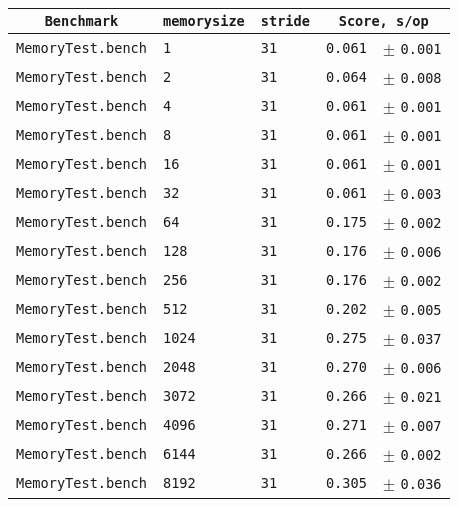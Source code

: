 \begin{tabular}{r|l|l|rl}
 \multicolumn{1}{c|}{\texttt{Benchmark}} & \texttt{memorysize} & \texttt{stride} & \multicolumn{2}{c}{\texttt{Score, s/op}} \\
\hline
\texttt{MemoryTest.bench} & \texttt{1} & \texttt{31} & \texttt{0.061} & \scriptsize $\pm$ \texttt{0.001}  \\
\texttt{MemoryTest.bench} & \texttt{2} & \texttt{31} & \texttt{0.064} & \scriptsize $\pm$ \texttt{0.008}  \\
\texttt{MemoryTest.bench} & \texttt{4} & \texttt{31} & \texttt{0.061} & \scriptsize $\pm$ \texttt{0.001}  \\
\texttt{MemoryTest.bench} & \texttt{8} & \texttt{31} & \texttt{0.061} & \scriptsize $\pm$ \texttt{0.001}  \\
\texttt{MemoryTest.bench} & \texttt{16} & \texttt{31} & \texttt{0.061} & \scriptsize $\pm$ \texttt{0.001}  \\
\texttt{MemoryTest.bench} & \texttt{32} & \texttt{31} & \texttt{0.061} & \scriptsize $\pm$ \texttt{0.003}  \\
\texttt{MemoryTest.bench} & \texttt{64} & \texttt{31} & \texttt{0.175} & \scriptsize $\pm$ \texttt{0.002}  \\
\texttt{MemoryTest.bench} & \texttt{128} & \texttt{31} & \texttt{0.176} & \scriptsize $\pm$ \texttt{0.006}  \\
\texttt{MemoryTest.bench} & \texttt{256} & \texttt{31} & \texttt{0.176} & \scriptsize $\pm$ \texttt{0.002}  \\
\texttt{MemoryTest.bench} & \texttt{512} & \texttt{31} & \texttt{0.202} & \scriptsize $\pm$ \texttt{0.005}  \\
\texttt{MemoryTest.bench} & \texttt{1024} & \texttt{31} & \texttt{0.275} & \scriptsize $\pm$ \texttt{0.037}  \\
\texttt{MemoryTest.bench} & \texttt{2048} & \texttt{31} & \texttt{0.270} & \scriptsize $\pm$ \texttt{0.006}  \\
\texttt{MemoryTest.bench} & \texttt{3072} & \texttt{31} & \texttt{0.266} & \scriptsize $\pm$ \texttt{0.021}  \\
\texttt{MemoryTest.bench} & \texttt{4096} & \texttt{31} & \texttt{0.271} & \scriptsize $\pm$ \texttt{0.007}  \\
\texttt{MemoryTest.bench} & \texttt{6144} & \texttt{31} & \texttt{0.266} & \scriptsize $\pm$ \texttt{0.002}  \\
\texttt{MemoryTest.bench} & \texttt{8192} & \texttt{31} & \texttt{0.305} & \scriptsize $\pm$ \texttt{0.036}  \\

\end{tabular}
